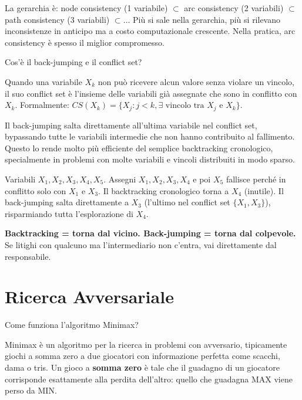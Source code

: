 \documentclass[12pt,a4paper]{article}
\begin{document}
La gerarchia è: node consistency (1 variabile) $\subset$ arc consistency (2 variabili) $\subset$ path consistency (3 variabili) $\subset \ldots$ Più si sale nella gerarchia, più si rilevano inconsistenze in anticipo ma a costo computazionale crescente. Nella pratica, arc consistency è spesso il miglior compromesso.

\begin{domandabox}{Cos'è il back-jumping e il conflict set?}
\end{domandabox}

Quando una variabile $X_k$ non può ricevere alcun valore senza violare un vincolo, il suo conflict set è l'insieme delle variabili già assegnate che sono in conflitto con $X_k$. Formalmente: $CS(X_k) = \{X_j : j < k, \exists \text{ vincolo tra } X_j \text{ e } X_k\}$.

Il back-jumping salta direttamente all'ultima variabile nel conflict set, bypassando tutte le variabili intermedie che non hanno contribuito al fallimento. Questo lo rende molto più efficiente del semplice backtracking cronologico, specialmente in problemi con molte variabili e vincoli distribuiti in modo sparso.

\begin{esempiobox}
Variabili $X_1, X_2, X_3, X_4, X_5$. Assegni $X_1, X_2, X_3, X_4$ e poi $X_5$ fallisce perché in conflitto solo con $X_1$ e $X_3$. Il backtracking cronologico torna a $X_4$ (inutile). Il back-jumping salta direttamente a $X_3$ (l'ultimo nel conflict set $\{X_1, X_3\}$), risparmiando tutta l'esplorazione di $X_4$.
\end{esempiobox}

\begin{ricordabox}
\textbf{Backtracking = torna dal vicino. Back-jumping = torna dal colpevole.} Se litighi con qualcuno ma l'intermediario non c'entra, vai direttamente dal responsabile.
\end{ricordabox}

\section{Ricerca Avversariale}

\begin{domandabox}{Come funziona l'algoritmo Minimax?}
\end{domandabox}

Minimax è un algoritmo per la ricerca in problemi con avversario, tipicamente giochi a somma zero a due giocatori con informazione perfetta come scacchi, dama o tris. Un gioco a \textbf{somma zero} è tale che il guadagno di un giocatore corrisponde esattamente alla perdita dell'altro: quello che guadagna MAX viene perso da MIN.
\end{document}
